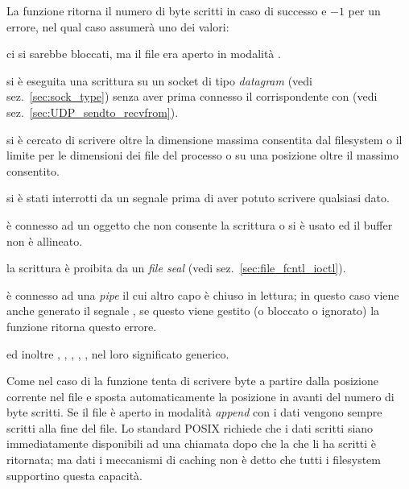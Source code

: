 \begin{funcproto}{
}

{La funzione ritorna il numero di byte scritti in caso di successo e $-1$ per
  un errore, nel qual caso  assumerà uno dei valori:
  \begin{errlist}
  \item[\errcode{EAGAIN}] ci si sarebbe bloccati, ma il file era aperto in
    modalità .
  \item[\errcode{EDESTADDRREQ}] si è eseguita una scrittura su un socket di
    tipo \textit{datagram} (vedi sez.~\ref{sec:sock_type}) senza aver prima
    connesso il corrispondente con  (vedi
    sez.~\ref{sec:UDP_sendto_recvfrom}).
  \item[\errcode{EFBIG}] si è cercato di scrivere oltre la dimensione massima
    consentita dal filesystem o il limite per le dimensioni dei file del
    processo o su una posizione oltre il massimo consentito.
  \item[\errcode{EINTR}] si è stati interrotti da un segnale prima di aver
    potuto scrivere qualsiasi dato.
  \item[\errcode{EINVAL}]  è connesso ad un oggetto che non consente
    la scrittura o si è usato  ed il buffer non è allineato.
  \item[\errcode{EPERM}] la scrittura è proibita da un \textit{file seal}
    (vedi sez.~\ref{sec:file_fcntl_ioctl}).
  \item[\errcode{EPIPE}]  è connesso ad una \textit{pipe} il cui
    altro capo è chiuso in lettura; in questo caso viene anche generato il
    segnale , se questo viene gestito (o bloccato o ignorato)
    la funzione ritorna questo errore.
  \end{errlist}
  ed inoltre , , , ,
  ,  nel loro significato generico.}
\end{funcproto}



Come nel caso di  la funzione tenta di scrivere  byte
a partire dalla posizione corrente nel file e sposta automaticamente la
posizione in avanti del numero di byte scritti. Se il file è aperto in
modalità \textit{append} con  i dati vengono sempre scritti
alla fine del file.  Lo standard POSIX richiede che i dati scritti siano
immediatamente disponibili ad una  chiamata dopo che la
 che li ha scritti è ritornata; ma dati i meccanismi di caching
non è detto che tutti i filesystem supportino questa capacità.

